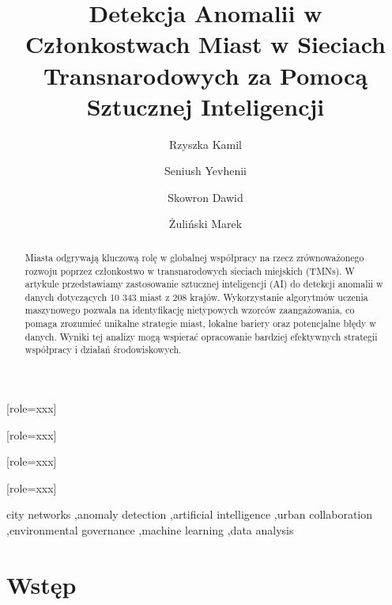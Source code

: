 \documentclass[a4paper,fleqn]{cas-dc}
\begin{document}
\let\WriteBookmarks\relax
\def\floatpagepagefraction{1}
\def\textpagefraction{.001}


\title [mode = title]{Detekcja Anomalii w Członkostwach Miast w Sieciach Transnarodowych za Pomocą Sztucznej Inteligencji}                      


\author[1]{Rzyszka Kamil}[role=xxx]


\author[1]{Seniush Yevhenii}[role=xxx]

\author[1]{Skowron Dawid}[role=xxx]

\author[1]{Żuliński Marek}[role=xxx]




\begin{abstract}
Miasta odgrywają kluczową rolę w globalnej współpracy na rzecz zrównoważonego rozwoju poprzez członkostwo w transnarodowych sieciach miejskich (TMNs). W artykule przedstawiamy zastosowanie sztucznej inteligencji (AI) do detekcji anomalii w danych dotyczących 10 343 miast z 208 krajów. Wykorzystanie algorytmów uczenia maszynowego pozwala na identyfikację nietypowych wzorców zaangażowania, co pomaga zrozumieć unikalne strategie miast, lokalne bariery oraz potencjalne błędy w danych. Wyniki tej analizy mogą wspierać opracowanie bardziej efektywnych strategii współpracy i działań środowiskowych.
\end{abstract}

\begin{keywords}
city networks \sep anomaly detection \sep artificial intelligence \sep urban collaboration \sep environmental governance \sep machine learning \sep data analysis
\end{keywords}



\maketitle

\section{Wstęp}
\end{document}
